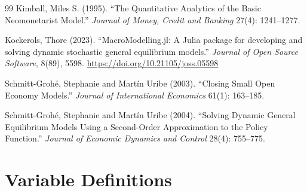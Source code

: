 \documentclass[12pt]{article}
\begin{document}
\begin{thebibliography}{99}
Kimball, Miles S. (1995).
\newblock ``The Quantitative Analytics of the Basic Neomonetarist Model.''
\newblock \textit{Journal of Money, Credit and Banking} 27(4): 1241--1277.

Kockerols, Thore (2023).
\newblock ``MacroModelling.jl: A Julia package for developing and solving dynamic stochastic general equilibrium models.''
\newblock \emph{Journal of Open Source Software}, 8(89), 5598. \url{https://doi.org/10.21105/joss.05598}

Schmitt-Grohé, Stephanie and Martín Uribe (2003).
\newblock ``Closing Small Open Economy Models.''
\newblock \textit{Journal of International Economics} 61(1): 163--185.

Schmitt-Grohé, Stephanie and Martín Uribe (2004).
\newblock ``Solving Dynamic General Equilibrium Models Using a Second-Order Approximation to the Policy Function.''
\newblock \textit{Journal of Economic Dynamics and Control} 28(4): 755--775.

\end{thebibliography}

\appendix

\section{Variable Definitions}
\end{document}
